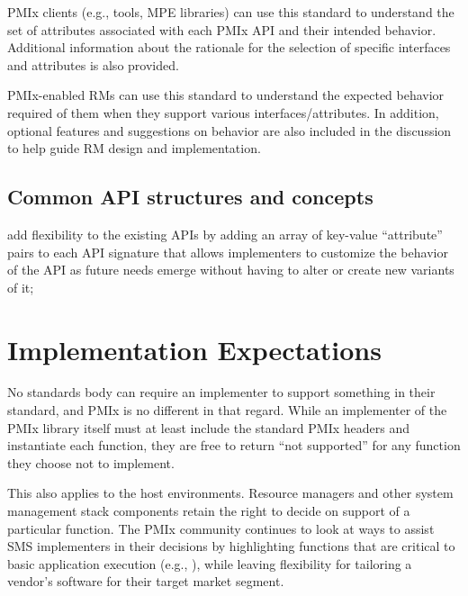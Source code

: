 
\ac{PMIx} clients (e.g., tools, \ac{MPE} libraries) can use this standard to understand the set of attributes associated with each \ac{PMIx} API and their intended behavior.
Additional information about the rationale for the selection of specific interfaces and attributes is also provided.

\ac{PMIx}-enabled \acp{RM} can use this standard to understand the expected behavior required of them when they support various interfaces/attributes.
In addition, optional features and suggestions on behavior are also included in the discussion to help guide \ac{RM} design and implementation.

\subsection{Common API structures and concepts}

add flexibility to the existing \acp{API} by adding an array of key-value ``attribute'' pairs to each \ac{API} signature that allows implementers to customize the behavior of the \ac{API} as future needs emerge without having to alter or create new variants of it;

\section{Implementation Expectations}
\label{chap:intro:required_functionality}


No standards body can require an implementer to support something in their standard, and \ac{PMIx} is no different in that regard. While an implementer of the \ac{PMIx} library itself must at least include the standard \ac{PMIx} headers and instantiate each function, they are free to return ``not supported'' for any function they choose not to implement.


This also applies to the host environments. Resource managers and other system management stack components retain the right to decide on support of a particular function. The \ac{PMIx} community continues to look at ways to assist \ac{SMS} implementers in their decisions by highlighting functions that are critical to basic application execution (e.g., ), while leaving flexibility for tailoring a vendor's software for their target market segment.

